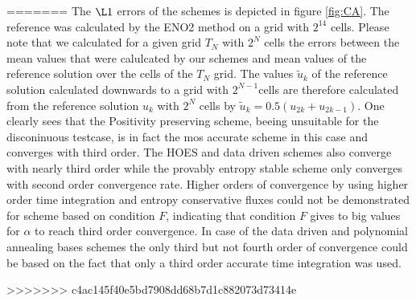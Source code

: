 =======
	The $\L1$ errors of the schemes is depicted in figure \ref{fig:CA}. The reference was calculated by the ENO2 method \cite {ENOIII} on a grid with $2^{14}$ cells. Please note that we calculated for a given grid $T_N$ with $2^N$ cells the errors between the mean values that were calulcated by our schemes and mean values of the reference solution over the cells of the $T_N$ grid. The values $\tilde u_k$ of the reference solution calculated downwards to a grid with $2^{N-1}$cells are therefore calculated from the reference solution $u_k$ with $2^N$ cells by $\tilde u_k = 0.5(u_{2k} + u_{2k-1})$. One clearly sees that the Positivity preserving scheme, beeing unsuitable for the disconinuous testcase, is in fact the mos accurate scheme in this case and converges with third order. The HOES and data driven schemes also converge with nearly third order while the provably entropy stable scheme only converges with second order convergence rate. Higher orders of convergence by using higher order time integration and entropy conservative fluxes could not be demonstrated for scheme based on condition $F$, indicating that condition $F$ gives to big values for $\alpha$ to reach third order convergence. In case of the data driven and polynomial annealing bases schemes the only third but not fourth order of convergence could be based on the fact that only a third order accurate time integration was used.
	
>>>>>>> c4ac145f40e5bd7908dd68b7d1c882073d73414e
	
	